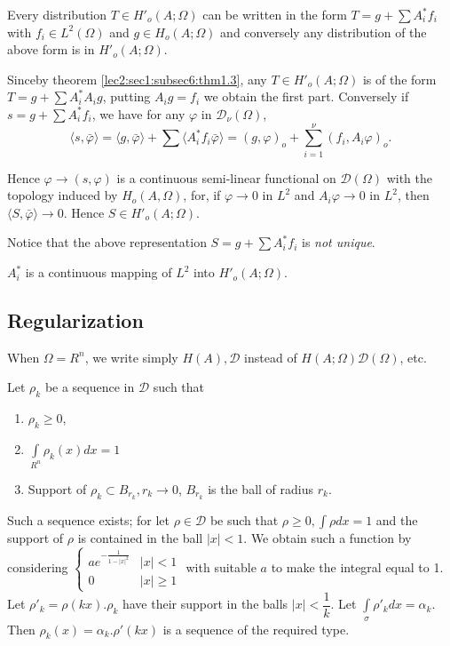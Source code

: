 \begin{proposition}\label{lec2:sec1:subsec6:prop1.5}%
  Every distribution $T \in H'_o(A; \Omega)$ can be written in
  the form $T =g+ \sum A^* _i f_i$ with $f_i \in L^2 (\Omega)$
  and $g \in H_o(A; \Omega)$ and conversely any distribution of
  the above form is in $H'_o (A; \Omega)$. 
\end{proposition}

Since\pageoriginale by theorem \ref{lec2:sec1:subsec6:thm1.3}, any $T \in H'_o(A; \Omega)$ is of the
form $T =g+\sum A^*_i A_i g$, putting $A_i g=f_i$ we obtain the first
part. Conversely if $s=g+\sum A^*_i f_i$, we have for any $\varphi$ in
$\mathscr{D}_\nu (\Omega)$, 
$$
\langle s, \bar{\varphi} \rangle =\langle g, \bar{\varphi} \rangle
+\sum \langle A^*_if_i \bar{\varphi} \rangle =(g, \varphi)_o +\sum^\nu
_{i=1} (f_i,A_i \varphi)_o. 
$$

Hence $\varphi \to (s, \varphi)$ is a continuous semi-linear
functional on $\mathscr{D}(\Omega)$ with the topology induced by $H_o
(A, \Omega)$, for, if $\varphi \to 0$ in $L^2$ and $A_i \varphi \to 0$
in $L^2$, then $\langle S, \bar{\varphi} \rangle \to 0$. Hence $S
\in H'_o (A; \Omega)$.  

Notice that the above representation $S=g+ \sum A^*_if_i$ is \textit{
  not unique}. 
\begin{coro*}
$A^*_i$ is a continuous mapping of $L^2$ into $H'_o (A; \Omega)$.
\end{coro*}

\subsection{Regularization}\label{lec2:sec1:subsec7}

When $\Omega=R^n$, we write simply $H(A),\mathscr{D}$ instead of $H(A;
\Omega) \mathscr{D}(\Omega)$, etc. 

Let $\rho_k$ be a sequence in $\mathscr{D}$ such that
\begin{enumerate}[1)]
\item $\rho _k \ge 0$,
\item $\int \limits _{R^n} \rho _k (x)dx=1$
\item Support of $\rho_k \subset B_{r_k},r_k \to 0$, $B_{r_k}$ is the
  ball of radius $r_k$. 
\end{enumerate}

Such a sequence exists; for let $\rho \in \mathscr{D}$ be such
that $\rho \ge 0, \int \rho dx=1$ and the support of $\rho$ is
contained in the ball $|x|<1$. We obtain such a function by
considering 
$\begin{cases}
ae^{-\frac{1}{1-|x|^2}} &|x|<1 \\ 
0  &|x|\ge 1
\end{cases}$
with suitable $a$ to make the integral equal to 1. Let $\rho '_k= \rho
(kx). \rho_k$ have their support in the balls $|x|< \dfrac{1}{k}$. Let
$\int \limits _ \sigma \rho'_k dx=\alpha_k$. Then $\rho _k (x)= \alpha
_k .\rho' (k x)$ is a sequence of the required type. 

